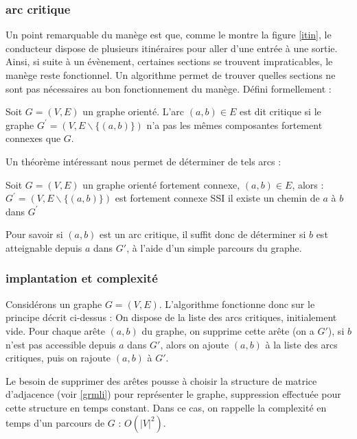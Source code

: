 \documentclass[11pt]{article}
\begin{document}
		\subsubsection{arc critique}
	Un point remarquable du manège est que, comme le montre la figure \ref{itin}, le conducteur dispose de plusieurs itinéraires pour aller d'une entrée à une sortie. Ainsi, si suite à un évènement, certaines sections se trouvent impraticables, le manège reste fonctionnel. Un algorithme permet de trouver quelles sections ne sont pas nécessaires au bon fonctionnement du manège. Défini formellement :
\begin{defin}
	Soit $G = (V,E)$ un graphe orienté. L'arc $(a,b) \in E$ est dit critique si le graphe $G^\prime = (V,E\backslash \{(a,b)\})$ n'a pas les mêmes composantes fortement connexes que $G$.
\end{defin}
Un théorème intéressant nous permet de déterminer de tels arcs : 
\begin{theo}
		Soit $G=(V,E)$ un graphe orienté fortement connexe, $(a,b) \in E$, alors :
		$G^\prime = (V,E\backslash \{ (a,b) \})$ est fortement connexe SSI il existe un chemin de $a$ à $b$
		dans $G^\prime$
\end{theo}
Pour savoir si $(a,b)$ est un arc critique, il suffit donc de déterminer si $b$ est atteignable depuis $a$ dans $G\prime$, à l'aide d'un simple parcours du graphe.
		\subsubsection{implantation et complexité}
	Considérons un graphe $G=(V,E)$. L'algorithme fonctionne donc sur le principe décrit ci-dessus : On dispose de la liste des arcs critiques, initialement vide. Pour chaque arête $(a,b)$ du graphe, on supprime cette arête (on a $G\prime$), si $b$ n'est pas accessible depuis $a$ dans $G\prime$, alors on ajoute $(a,b)$ à la liste des arcs critiques, puis on rajoute $(a,b)$ à $G\prime$.\par 
Le besoin de supprimer des arêtes pousse à choisir la structure de matrice d'adjacence (voir \ref{grmli}) pour représenter le graphe, suppression effectuée pour cette structure en temps constant. Dans ce cas, on rappelle la complexité en temps d'un parcours de $G$ : $O(|V|^2)$. \par 
\end{document}
